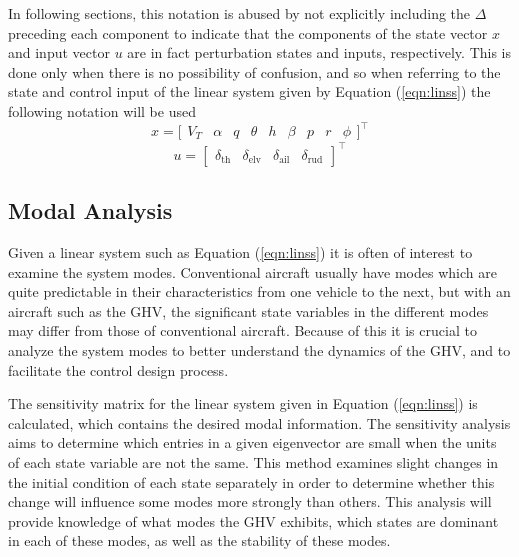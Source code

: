 In following sections, this notation is abused by not explicitly including the $\Delta$ preceding each component to indicate that the components of the state vector $x$ and input vector $u$ are in fact perturbation states and inputs, respectively.
This is done only when there is no possibility of confusion, and so when referring to the state and control input of the linear system given by Equation (\ref{eqn:linss}) the following notation will be used
\begin{equation}
  \label{eqn:perturbedstatevectorx}
  x=\bigr[
  \begin{array}{ccccccccc}
    V_{T} & \alpha & q &\theta & h & \beta &p & r & \phi
  \end{array}\bigr]^{\top}
\end{equation}
\begin{equation}
  u=\left[
  \begin{array}{cccc}
    \delta_{\text{th}} & \delta_{\text{elv}} & \delta_{\text{ail}} & \delta_{\text{rud}}
  \end{array}\right]^{\top}
\end{equation}

\subsection{Modal Analysis}

Given a linear system such as Equation (\ref{eqn:linss}) it is often of interest to examine the system modes.
Conventional aircraft usually have modes which are quite predictable in their characteristics from one vehicle to the next, but with an aircraft such as the GHV, the significant state variables in the different modes may differ from those of conventional aircraft.
Because of this it is crucial to analyze the system modes to better understand the dynamics of the GHV, and to facilitate the control design process.

The sensitivity matrix for the linear system given in Equation (\ref{eqn:linss}) is calculated, which contains the desired modal information.
The sensitivity analysis aims to determine which entries in a given eigenvector are small when the units of each state variable are not the same.
This method examines slight changes in the initial condition of each state separately in order to determine whether this change will influence some modes more strongly than others.
This analysis will provide knowledge of what modes the GHV exhibits, which states are dominant in each of these modes, as well as the stability of these modes.

